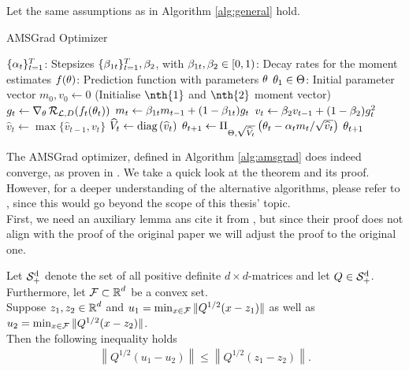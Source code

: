 \begin{algorithm}[H]
Let the same assumptions as in Algorithm \ref{alg:general} hold.
\caption{AMSGrad Optimizer}\label{alg:amsgrad}
\begin{algorithmic}[1]
\Require $\{\alpha_t\}_{t=1}^T$: Stepsizes
\Require $\{\beta_{1t}\}_{t=1}^T, \beta_2$, with $\beta_{1t},\beta_2\in [0,1)$: Decay rates for the moment estimates
\Require $f(\theta)$: Prediction function with parameters $\theta$
\Require $\theta_1\in\operatorname{\Theta}$: Initial parameter vector
\State $m_0,v_0 \gets 0$ (Initialise $\nth{1}$ and $\nth{2}$ moment vector)
	\State $g_t \gets \nabla_{\theta}\operatorname{\mathcal{R}}_{\operatorname{\mathcal{L}}, D}(f_t(\theta_t))$ 
	\State $m_t \gets \beta_{1t}m_{t-1} + (1-\beta_{1t})g_t$ 
	\State $v_t \gets \beta_{2}v_{t-1} + (1-\beta_{2})g_t^2$ 
	\State $\hat{v}_{t} \gets \max\{\hat{v}_{t-1}, v_t\}$ 
	\State $\widehat{V}_{t} \gets \operatorname{\text{diag}}\left(\widehat{v}_{t}\right)$ 
	\State $\theta_{t+1} \gets \Pi_{\operatorname{\Theta},\sqrt{\widehat{V}_t}}\left(\theta_{t} - \alpha_tm_t/\sqrt{\widehat{v}_t}\right)$ 
\EndFor
\State \Return $\theta_{t+1}$ 
\end{algorithmic}
\end{algorithm}

The AMSGrad optimizer, defined in Algorithm \ref{alg:amsgrad} does indeed converge, as proven in \cite[Theorem~4]{reddi2019convergence}. We take a quick look at the theorem and its proof. However, for a deeper understanding of the alternative algorithms, please refer to  \cite{reddi2019convergence}, since this would go beyond the scope of this thesis' topic.\\
First, we need an auxiliary lemma ans cite it from \cite[Lemma~4]{reddi2019convergence}, but since their proof does not align with the proof of the original paper \cite[Lemma~3]{mcmahan2010adaptive} we will adjust the proof to the original one.

\begin{lemma}\label{lemma:McMahan_Streeter}
Let $\operatorname{\mathcal{S}^d_{+}}$ denote the set of all positive definite $d\times d$-matrices and let $Q\in \operatorname{\mathcal{S}^d_{+}}$. Furthermore, let $\operatorname{\mathcal{F}}\subset \operatorname{\mathbb{R}}^d$ be a convex set.\\
Suppose $z_1,z_2 \in\operatorname{\mathbb{R}}^d$ and $u_1 = \min_{x\in\operatorname{\mathcal{F}}} \|Q^{1/2}(x-z_1)\|$ as well as $u_2 = \min_{x\in\operatorname{\mathcal{F}}} \|Q^{1/2}(x-z_2)\|$.\\
Then the following inequality holds
\begin{align*}
\left\| Q^{1/2} \left( u_1 - u_2 \right) \right\| \leq \left\| Q^{1/2} \left( z_1 - z_2 \right) \right\|.
\end{align*}
\end{lemma}

